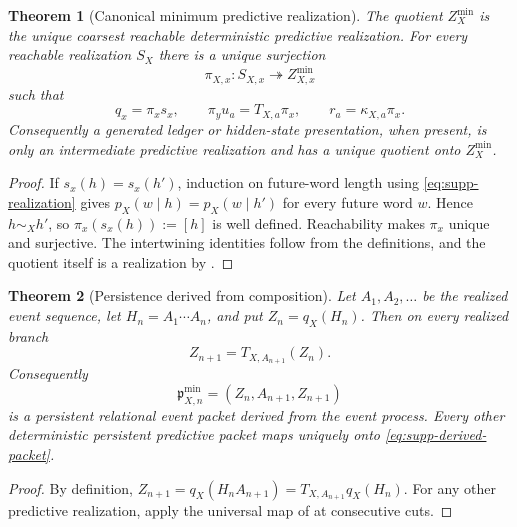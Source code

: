 \documentclass[11pt]{article}
\newtheorem{theorem}{Theorem}[section]
\theoremstyle{definition}
\theoremstyle{remark}
\begin{document}
\begin{theorem}[Canonical minimum predictive realization]
\label{thm:supp-minimal-record}
The quotient $Z_X^{\min}$ is the unique coarsest reachable deterministic
predictive realization.  For every reachable realization $S_X$ there is a
unique surjection
\begin{equation}
 \boxed{\pi_{X,x}:S_{X,x}\twoheadrightarrow Z_{X,x}^{\min}}
 \label{eq:supp-universal-surjection}
\end{equation}
such that
\begin{equation}
 q_x=\pi_xs_x,
 \qquad
 \pi_yu_a=T_{X,a}\pi_x,
 \qquad
 r_a=\kappa_{X,a}\pi_x.
 \label{eq:supp-universal-intertwining}
\end{equation}
Consequently a generated ledger or hidden-state presentation, when present,
is only an intermediate predictive realization and has a unique quotient onto
$Z_X^{\min}$.
\end{theorem}

\begin{proof}
If $s_x(h)=s_x(h')$, induction on future-word length using
\eqref{eq:supp-realization} gives $p_X(w\mid h)=p_X(w\mid h')$ for every
future word $w$.  Hence $h\sim_Xh'$, so
$\pi_x(s_x(h)):=[h]$ is well defined.  Reachability makes $\pi_x$ unique and
surjective.  The intertwining identities follow from the definitions, and the
quotient itself is a realization by
.
\end{proof}

\begin{theorem}[Persistence derived from composition]
\label{thm:supp-persistence-derived}
Let $A_1,A_2,\ldots$ be the realized event sequence, let
$H_n=A_1\cdots A_n$, and put $Z_n=q_X(H_n)$.  Then on every realized branch
\begin{equation}
 \boxed{Z_{n+1}=T_{X,A_{n+1}}(Z_n).}
 \label{eq:supp-persistence}
\end{equation}
Consequently
\begin{equation}
 \boxed{\mathfrak p_{X,n}^{\min}=(Z_n,A_{n+1},Z_{n+1})}
 \label{eq:supp-derived-packet}
\end{equation}
is a persistent relational event packet derived from the event process.  Every
other deterministic persistent predictive packet maps uniquely onto
\eqref{eq:supp-derived-packet}.
\end{theorem}

\begin{proof}
By definition,
$Z_{n+1}=q_X(H_nA_{n+1})=T_{X,A_{n+1}}q_X(H_n)$.  For any other predictive
realization, apply the universal map of
 at consecutive cuts.
\end{proof}
\end{document}
